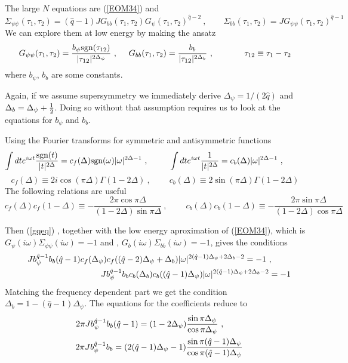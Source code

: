 \documentclass[aps,pre,preprint,onecolumn,citeautoscript,superscriptaddress,nofootinbib,eqsecnum]{revtex4-1}
\def\bea{\begin{eqnarray}}
\def\eea{\end{eqnarray}}
\def\nref#1{(\ref{#1})}
\def\be{\begin{equation}}
\def\ee{\end{equation}}
\def\sign{{\rm sgn}}
\def\la{\label}
\begin{document}
 The large $N$  equations are \nref{EOM34} and
 \be   \label{gqeq}
 \Sigma_{\psi \psi}(\tau_1,\tau_2)=(\hat q -1)  J G_{bb}(\tau_1,\tau_2)G_{\psi}(\tau_1,\tau_2)^{\hat q -2}~,~~~~~~~~~
\Sigma_{bb}(\tau_1,\tau_2)=   J G_{\psi \psi}(\tau_1,\tau_2)^{\hat q -1} 
\ee
 We can explore them at low energy by 
making  the ansatz 
\be \la{ansatzq}
 G_{\psi \psi}(\tau_1,\tau_2) = { b_\psi \sign(\tau_{12} ) \over |\tau_{12}|^{ 2 \Delta_\psi } }~,~~~~G_{bb}(\tau_1,\tau_2) = { b_b \over |\tau_{12}|^{2 \Delta_b } }~,~~~~~~~~~~~
\tau_{12} \equiv  \tau_1 -\tau_2 
\ee
where $b_\psi$, $b_b$ are some constants. 

Again, if we assume supersymmetry we immediately derive $\Delta_\psi = 1/(2 \hat q )$ and $\Delta_b = \Delta_\psi + {1 \over 2 } $. 
Doing so without that assumption requires us to look at the equations for $b_\psi$ and $b_b$.

Using the Fourier transforms for symmetric and antisymmetric functions 
\be
\int dt e^{ i \omega t } { \sign(t) \over |t|^{ 2 \Delta } }  = c_f(\Delta) \sign(\omega ) |\omega|^{ 2 \Delta - 1 } ~,~~~~~~~~
\int dt e^{ i \omega t } { 1 \over |t|^{ 2 \Delta } }  = c_b(\Delta)   |\omega|^{ 2 \Delta - 1 } ~,~~~~~~~~
\ee
\be
c_f(\Delta ) \equiv 2 i   \cos (\pi \Delta) \Gamma(1-2 \Delta)  ~,~~~~~~~~~~c_b(\Delta) \equiv  2 \sin (\pi \Delta) \Gamma(1-2 \Delta)
\ee
The following relations are useful
\be
c_f(\Delta ) c_f(1-\Delta ) \equiv - \frac{2 \pi \cos \pi \Delta}{(1- 2 \Delta) \sin \pi \Delta}  ~,~~~~~~~~~~c_b(\Delta)c_b(1-\Delta) \equiv  - \frac{2 \pi \sin \pi \Delta}{(1- 2 \Delta) \cos \pi \Delta}
\ee

Then \nref{gqeq} , together with the low energy aproximation of \nref{EOM34}, which is $G_{\psi}(i\omega) \Sigma_{\psi \psi}(i\omega) = -1$ and
, $G_{b}(i\omega) \Sigma_{b b}(i\omega) = -1$,
gives the conditions 
\bea  
&&   J b_\psi^{\hat q -1} b_b (\hat q -1) c_f(\Delta_\psi) c_f((\hat q -2)\Delta_\psi + \Delta_b)  |\omega|^{2 (\hat q -1)\Delta_\psi + 2\Delta_b-2} =-1   ~,~~~~~~~ 
\cr
& & J b_\psi^{\hat q -1} b_b  c_b(\Delta_b) c_b((\hat q -1) \Delta_\psi)   |\omega|^{2(\hat q -1) \Delta_\psi + 2 \Delta_b  -2} =-1 \la{LEEq}
 \eea
Matching the frequency dependent part we get the condition $\Delta_b = 1 - ( \hat q -1) \Delta_\psi$. The equations for the coefficients reduce to 
 \bea  
&&  2 \pi  J b_\psi^{\hat q -1} b_b (\hat q -1) =(1- 2 \Delta_\psi)  \frac{\sin \pi \Delta_\psi}{\cos \pi \Delta_\psi}   ~,~~~~~~~ 
\cr
& & 2 \pi J b_\psi^{\hat q -1} b_b =(2 ( \hat q -1) \Delta_\psi -1)  \frac{\sin \pi  ( \hat q -1)\Delta_\psi} {\cos \pi  ( \hat q -1)\Delta_\psi}  \la{LEEq2}
 \eea
 
\end{document}
